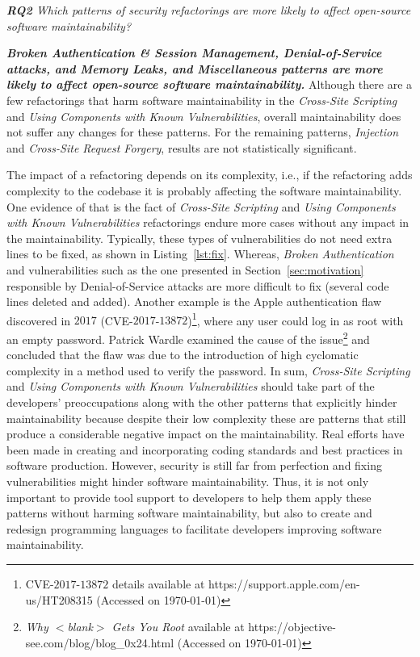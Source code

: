 \documentclass[10pt,conference]{IEEEtran}
\begin{document}
\begin{framed}
\textit{\textbf{RQ2} Which patterns of security refactorings are more likely to
affect open-source software maintainability?}
\end{framed}

\textbf{\textit{Broken Authentication \& Session Management, Denial-of-Service
attacks, and Memory Leaks, and Miscellaneous patterns are more likely to affect
open-source software maintainability.}} Although there are a few refactorings
that harm software maintainability in the \emph{Cross-Site Scripting} and
\emph{Using Components with Known Vulnerabilities}, overall maintainability does
not suffer any changes for these patterns. For the remaining patterns,
\emph{Injection} and \emph{Cross-Site Request Forgery}, results are not
statistically significant.

The impact of a refactoring depends on its complexity, i.e., if the refactoring
adds complexity to the codebase it is probably affecting the software
maintainability. One evidence of that is the fact of \emph{Cross-Site Scripting}
and \emph{Using Components with Known Vulnerabilities} refactorings endure more
cases without any impact in the maintainability. Typically, these types of
vulnerabilities do not need extra lines to be fixed, as shown in
Listing~\ref{lst:fix}. Whereas, \emph{Broken Authentication} and vulnerabilities
such as the one presented in Section~\ref{sec:motivation} responsible by Denial-of-Service
attacks are more difficult to fix (several code lines deleted and added).
Another example is the Apple authentication flaw discovered in $2017$
(CVE-$2017$-$13872$)\footnote{CVE-$2017$-$13872$ details available at
https://support.apple.com/en-us/HT208315 (Accessed on \today{})}, where any user
could log in as root with an empty password. Patrick Wardle examined the cause
of the issue\footnote{\emph{Why $<$blank$>$ Gets You Root} available at
https://objective-see.com/blog/blog\_0x24.html (Accessed on \today{})} and
concluded that the flaw was due to the introduction of high cyclomatic complexity
in a method used to verify the password. In sum, \emph{Cross-Site Scripting} and
\emph{Using Components with Known Vulnerabilities} should take part of the
developers' preoccupations along with the other patterns that explicitly hinder
maintainability because despite their low complexity these are patterns that
still produce a considerable negative impact on the maintainability. Real
efforts have been made in creating and incorporating coding standards and best
practices in software production. However, security is still far from perfection
and fixing vulnerabilities might hinder software maintainability. Thus, it is
not only important to provide tool support to developers to help them apply these
patterns without harming software maintainability, but also to create and redesign
programming languages to facilitate developers improving software maintainability.
\end{document}
